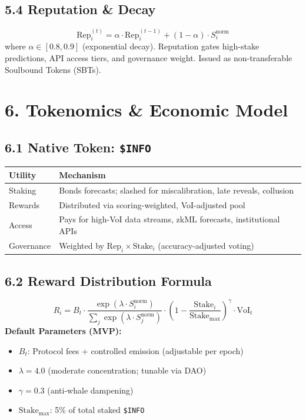 \documentclass[11pt,a4paper]{article}
\begin{document}
\subsection*{5.4 Reputation \& Decay}
\begin{equation}
\text{Rep}_i^{(t)} = \alpha \cdot \text{Rep}_i^{(t-1)} + (1-\alpha) \cdot S_i^{\text{norm}}
\end{equation}
where $\alpha \in [0.8, 0.9]$ (exponential decay). Reputation gates high-stake predictions, API access tiers, and governance weight. Issued as non-transferable Soulbound Tokens (SBTs).

\section*{6. Tokenomics \& Economic Model}
\subsection*{6.1 Native Token: \texttt{\$INFO}}
\begin{center}
\begin{tabularx}{\textwidth}{@{}lX@{}}
\toprule
\textbf{Utility} & \textbf{Mechanism} \\
\midrule
Staking & Bonds forecasts; slashed for miscalibration, late reveals, collusion \\
Rewards & Distributed via scoring-weighted, VoI-adjusted pool \\
Access & Pays for high-VoI data streams, zkML forecasts, institutional APIs \\
Governance & Weighted by $\text{Rep}_i \times \text{Stake}_i$ (accuracy-adjusted voting) \\
\bottomrule
\end{tabularx}
\end{center}

\subsection*{6.2 Reward Distribution Formula}
\begin{equation}
R_i = B_t \cdot \frac{\exp(\lambda \cdot S_i^{\text{norm}})}{\sum_{j} \exp(\lambda \cdot S_j^{\text{norm}})} \cdot \left(1 - \frac{\text{Stake}_i}{\text{Stake}_{\max}}\right)^\gamma \cdot \text{VoI}_t
\end{equation}
\textbf{Default Parameters (MVP):}
\begin{itemize}[leftmargin=*]
    \item $B_t$: Protocol fees + controlled emission (adjustable per epoch)
    \item $\lambda = 4.0$ (moderate concentration; tunable via DAO)
    \item $\gamma = 0.3$ (anti-whale dampening)
    \item $\text{Stake}_{\max}$: 5\% of total staked \texttt{\$INFO}
\end{itemize}
\end{document}
